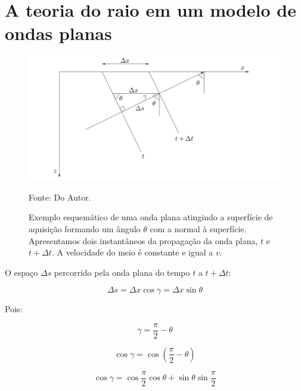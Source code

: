 \documentclass[a4paper, 12pt]{article}
\begin{document}
\section{A teoria do raio em um modelo de ondas planas}

\begin{figure}[H]
\caption{Exemplo esquemático de uma onda plana atingindo a superfície de aquisição formando um ângulo $\theta$
com a normal à superfície. Apresentamos dois instantâneos da propagação da onda plana, $t$ e $t + \Delta t$.
A velocidade do meio é constante e igual a $v$.}
\begin{center}
\includegraphics[scale=0.7]{images/raio_ondas_planas.png}
\vspace{-0.3cm}
\end{center}
\begin{center}
 Fonte: Do Autor.
\end{center}
\label{fig:1.1}
\end{figure}

O espaço $\Delta s$ percorrido pela onda plana do tempo $t$ a $t + \Delta t$:

\begin{equation}
\label{eq:1.1}
\Delta s = \Delta x \cos \gamma = \Delta x \sin \theta
\end{equation}

Pois:

\begin{equation}
\label{eq:1.2}
\gamma = \frac{\pi}{2} - \theta
\end{equation}

\begin{equation}
\label{eq:1.3}
\cos \gamma = \cos \left( \frac{\pi}{2} - \theta \right)
\end{equation}

\begin{equation}
\label{eq:1.4}
\cos \gamma = \cos \frac{\pi}{2} \cos \theta + \sin \theta \sin \frac{\pi}{2}
\end{equation}
\end{document}
